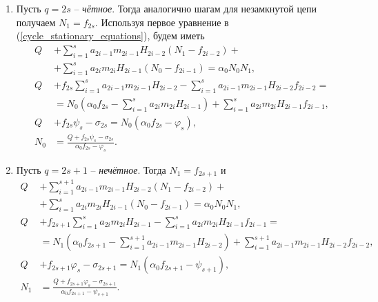 \begin{enumerate}
    \item Пусть \(q = 2s\) -- \textit{чётное}. Тогда аналогично шагам для незамкнутой цепи получаем \( N_1 = f_{2s} \).
    Используя первое уравнение в (\ref{cycle_stationary_equations}), будем иметь            
    \begin{equation*}
    \begin{split}
        Q & + \sum\limits_{i=1}^{s} a_{2i-1} m_{2i-1} H_{2i-2}(N_1 - f_{2i-2}) +\\
        & + \sum\limits_{i=1}^{s} a_{2i} m_{2i} H_{2i-1}(N_0-f_{2i-1}) = \alpha_0 N_0 N_1, \\
        Q &+ f_{2s} \sum\limits_{i=1}^{s} a_{2i-1} m_{2i-1} H_{2i-2} - \sum\limits_{i=1}^{s} a_{2i-1} m_{2i-1} H_{2i-2} f_{2i-2} = \\
        & = N_0 \left( \alpha_0 f_{2s} - \sum\limits_{i=1}^{s} a_{2i} m_{2i} H_{2i-1} \right) + \sum\limits_{i=1}^{s} a_{2i} m_{2i} H_{2i-1} f_{2i-1},  \\
        Q &+ f_{2s} \psi_s - \sigma_{2s} = N_0 \left( \alpha_0 f_{2s} - \varphi_s \right), \\
        N_0 &= \frac{Q + f_{2s} \psi_s - \sigma_{2s}}{\alpha_0 f_{2s} - \varphi_s}.
    \end{split}
    \end{equation*}

    \item Пусть \(q = 2s+1\) -- \textit{нечётное}. Тогда \( N_1 = f_{2s+1} \) и
    \begin{equation*}
        \begin{split}
            Q &+ \sum\limits_{i=1}^{s+1} a_{2i-1} m_{2i-1} H_{2i-2}(N_1 - f_{2i-2}) +\\
            & + \sum\limits_{i=1}^{s} a_{2i} m_{2i} H_{2i-1}(N_0-f_{2i-1}) = \alpha_0 N_0 N_1, \\
            Q &+ f_{2s+1} \sum\limits_{i=1}^{s} a_{2i} m_{2i} H_{2i-1} - \sum\limits_{i=1}^{s} a_{2i} m_{2i} H_{2i-1} f_{2i-1} = \\
            & = N_1 \left( \alpha_0 f_{2s+1} - \sum\limits_{i=1}^{s+1} a_{2i-1} m_{2i-1} H_{2i-2} \right) + \sum\limits_{i=1}^{s+1} a_{2i-1} m_{2i-1} H_{2i-2} f_{2i-2},  \\
            Q &+ f_{2s+1} \varphi_s - \sigma_{2s+1} = N_1 \left( \alpha_0 f_{2s+1} - \psi_{s+1} \right), \\
            N_1 &= \frac{Q + f_{2s+1} \varphi_s - \sigma_{2s+1}}{ \alpha_0 f_{2s+1} - \psi_{s+1} }.
        \end{split}
        \end{equation*}
\end{enumerate}

